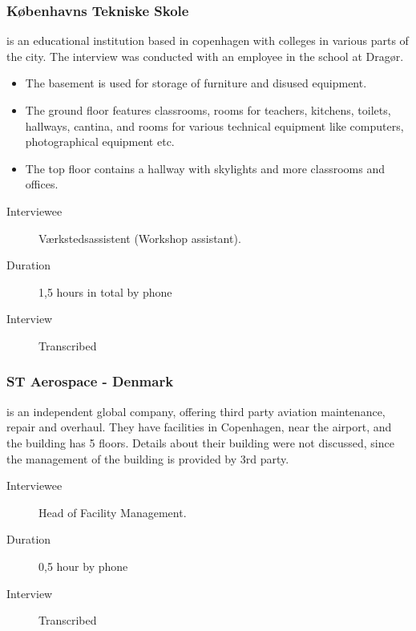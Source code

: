\subsubsection{K\o benhavns Tekniske Skole} is an educational institution based in copenhagen with colleges in various parts of the city. The interview was conducted with an employee in the school at Drag\o r. 
\begin{itemize}
	\item The basement is used for storage of furniture and disused equipment.
	\item The ground floor features classrooms, rooms for teachers, kitchens, toilets, hallways, cantina, and rooms for various technical equipment like computers, photographical equipment etc.
	\item The top floor contains a hallway with skylights and more classrooms and offices.
\end{itemize}
\begin{description}
	\item[Interviewee] Værkstedsassistent (Workshop assistant).
	\item[Duration] 1,5 hours in total by phone
	\item[Interview] Transcribed
\end{description}

\subsubsection{ST Aerospace - Denmark} is an independent global company, offering third party aviation maintenance, repair and overhaul. They have facilities in Copenhagen, near the airport, and the building has 5 floors. Details about their building were not discussed, since the management of the building is provided by 3rd party.
\begin{description}
	\item[Interviewee] Head of Facility Management.
	\item[Duration] 0,5 hour by phone
	\item[Interview] Transcribed
\end{description}


